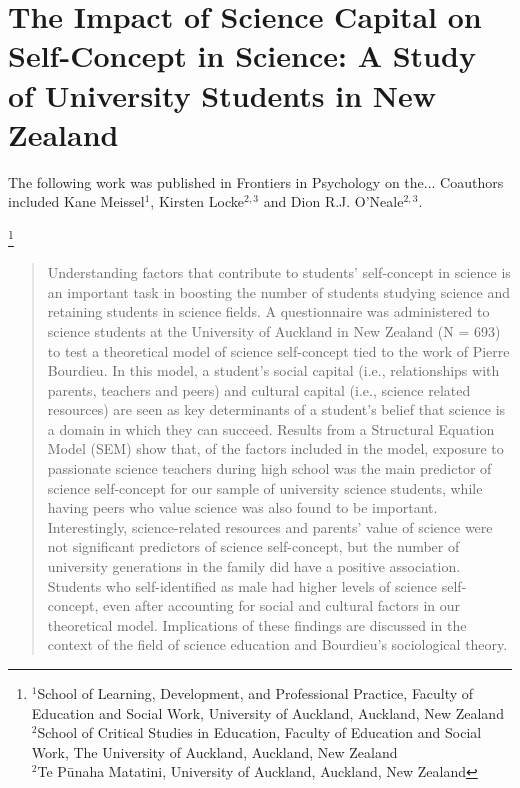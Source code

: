 \chapter[The Impact of Science Capital on Self-Concept in Science][]{The Impact of Science Capital on Self-Concept in Science: A Study of University Students in New Zealand}

The following work was published in Frontiers in Psychology on the... Coauthors included Kane Meissel$^1$, Kirsten Locke$^{2,3}$ and Dion R.J. O'Neale$^{2,3}$. 

\footnote{$^{1}$School of Learning, Development, and Professional Practice, Faculty of Education and Social Work, University of Auckland, Auckland, New Zealand \\
$^{2}$School of Critical Studies in Education, Faculty of Education and Social Work, The University of Auckland, Auckland, New Zealand \\
$^{2}$Te P\={u}naha Matatini, University of Auckland, Auckland, New Zealand }



\begin{abstract}
Understanding factors that contribute to students' self-concept in science is an important task in boosting the number of students studying science and retaining students in science fields. A questionnaire was administered to science students at the University of Auckland in New Zealand (N = 693) to test a theoretical model of science self-concept tied to the work of Pierre Bourdieu. In this model, a student's social capital (i.e., relationships with parents, teachers and peers) and cultural capital (i.e., science related resources) are seen as key determinants of a student's belief that science is a domain in which they can succeed. Results from a Structural Equation Model (SEM) show that, of the factors included in the model, exposure to passionate science teachers during high school was the main predictor of science self-concept for our sample of university science students, while having peers who value science was also found to be important. Interestingly, science-related resources and parents’ value of science were not significant predictors of science self-concept, but the number of university generations in the family did have a positive association.  Students who self-identified as male had higher levels of science self-concept, even after accounting for social and cultural factors in our theoretical model.  Implications of these findings are discussed in the context of the field of science education and Bourdieu's sociological theory.
\end{abstract}


